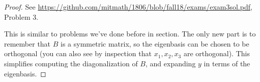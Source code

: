 \documentclass{article}
\theoremstyle{definition}
\begin{document}
\begin{proof}
	See \url{https://github.com/mitmath/1806/blob/fall18/exams/exam3sol.pdf}, Problem 3. 
	
	This is similar to problems we've done before in section. The only new part is to remember that $B$ is a symmetric matrix, so the eigenbasis can be chosen to be orthogonal (you can also see by inspection that $x_1, x_2, x_3$ are orthogonal). This simplifies computing the diagonalization of $B$, and expanding $y$ in terms of the eigenbasis.
\end{proof}
\end{document}
